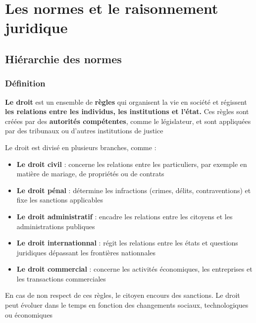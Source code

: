 \chapter{Les normes et le raisonnement juridique}
\section{Hiérarchie des normes}
\subsection{Définition}
\large{
\textbf{Le droit} est un ensemble de \textbf{règles} qui organisent la vie en société et régissent \textbf{les relations entre les individus, les institutions et l'état.}
Ces règles sont créées par des \textbf{autorités compétentes}, comme le législateur, et sont appliquées par des tribunaux ou d'autres institutions de justice \newline

Le droit est divisé en plusieurs branches, comme : \newline

}
\begin{itemize}
    \item \textbf{Le droit civil} : concerne les relations entre les particuliers, par exemple en matière de mariage, de propriétés ou de contrats
    \item \textbf{Le droit pénal} : détermine les infractions (crimes, délits, contraventions) et fixe les sanctions applicables
    \item \textbf{Le droit administratif} : encadre les relations entre les citoyens et les administrations publiques
    \item \textbf{Le droit internationnal} : régit les relations entre les états et questions juridiques dépassant les frontières nationnales
    \item \textbf{Le droit commercial} : concerne les activités économiques, les entreprises et les transactions commerciales
\end{itemize}
En cas de non respect de ces règles, le citoyen encours des sanctions. Le droit peut évoluer dans le temps en fonction des changements sociaux, technologiques ou économiques
